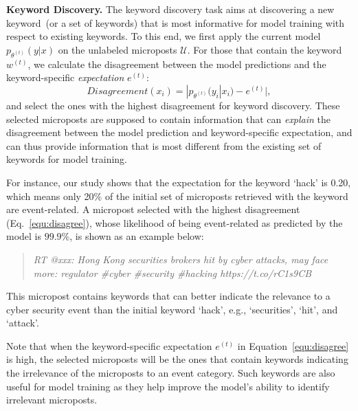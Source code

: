 \documentclass[letterpaper]{article}
\begin{document}
\smallskip
\noindent\textbf{Keyword Discovery.} The keyword discovery task aims at discovering a new keyword~(or a set of keywords) that is most informative for model training with respect to existing keywords. To this end, we first apply the current model $p_{\theta^{(t)}}(y|x)$ on the unlabeled microposts $\mathcal{U}$. For those that contain the keyword $w^{(t)}$, we calculate the disagreement between the model predictions and the keyword-specific \emph{expectation} $e^{(t)}$:
\begin{equation}
    Disagreement(x_i) = |p_{\theta^{(t)}}(y_i|x_i) - e^{(t)}|,
    \label{equ:disagree}
\end{equation}
and select the ones with the highest disagreement for keyword discovery. These selected microposts are supposed to contain information that can \emph{explain} the disagreement between the model prediction and keyword-specific expectation, and can thus provide information that is most different from the existing set of keywords for model training.

For instance, our study shows that the expectation for the keyword \lq hack' is 0.20, which means only 20\% of the initial set of microposts retrieved with the keyword are event-related. A micropost selected with the highest disagreement (Eq.~\ref{equ:disagree}), whose likelihood of being event-related as predicted by the model is $99.9\%$, is shown as an example below:

\begin{quote}
    \emph{RT @xxx: Hong Kong securities brokers hit by cyber attacks, may face more: regulator \#cyber \#security \#hacking https://t.co/rC1s9CB} 
\end{quote}

\noindent This micropost contains keywords that can better indicate the relevance to a cyber security event than the initial keyword \lq hack', e.g., \lq securities', \lq hit', and \lq attack'. 

Note that when the keyword-specific expectation $e^{(t)}$ in Equation~\ref{equ:disagree} is high, the selected microposts will be the ones that contain keywords indicating the irrelevance of the microposts to an event category. Such keywords are also useful for model training as they help improve the model's ability to identify irrelevant microposts. 
\end{document}
